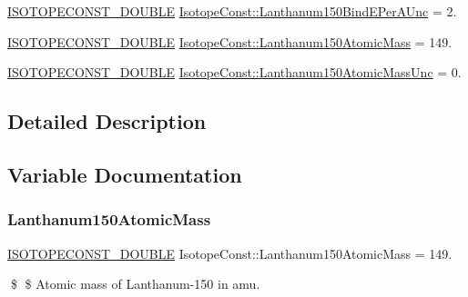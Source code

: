 \begin{DoxyCompactItemize}
\mbox{\hyperlink{group___isotope_const-_macros_ga8f45a7272ce02c0b4c65c44636ed719a}{I\+S\+O\+T\+O\+P\+E\+C\+O\+N\+S\+T\+\_\+\+D\+O\+U\+B\+LE}} \mbox{\hyperlink{group___isotope_const-_lanthanum-_la150_ga5c864ed4748572f2b13c236f3978333a}{Isotope\+Const\+::\+Lanthanum150\+Bind\+E\+Per\+A\+Unc}} = 2.
\item 
\mbox{\hyperlink{group___isotope_const-_macros_ga8f45a7272ce02c0b4c65c44636ed719a}{I\+S\+O\+T\+O\+P\+E\+C\+O\+N\+S\+T\+\_\+\+D\+O\+U\+B\+LE}} \mbox{\hyperlink{group___isotope_const-_lanthanum-_la150_ga434be1544ff86fef1501b8f6a53dda74}{Isotope\+Const\+::\+Lanthanum150\+Atomic\+Mass}} = 149.
\item 
\mbox{\hyperlink{group___isotope_const-_macros_ga8f45a7272ce02c0b4c65c44636ed719a}{I\+S\+O\+T\+O\+P\+E\+C\+O\+N\+S\+T\+\_\+\+D\+O\+U\+B\+LE}} \mbox{\hyperlink{group___isotope_const-_lanthanum-_la150_ga934d5be43c39f663f8bf9ccbf339a612}{Isotope\+Const\+::\+Lanthanum150\+Atomic\+Mass\+Unc}} = 0.
\end{DoxyCompactItemize}


\subsection{Detailed Description}


\subsection{Variable Documentation}
\mbox{\label{group___isotope_const-_lanthanum-_la150_ga434be1544ff86fef1501b8f6a53dda74}} 
\subsubsection{\texorpdfstring{Lanthanum150\+Atomic\+Mass}{Lanthanum150AtomicMass}}
{\footnotesize\ttfamily \mbox{\hyperlink{group___isotope_const-_macros_ga8f45a7272ce02c0b4c65c44636ed719a}{I\+S\+O\+T\+O\+P\+E\+C\+O\+N\+S\+T\+\_\+\+D\+O\+U\+B\+LE}} Isotope\+Const\+::\+Lanthanum150\+Atomic\+Mass = 149.}

\$ \$ Atomic mass of Lanthanum-\/150 in amu. \mbox{\label{group___isotope_const-_lanthanum-_la150_ga934d5be43c39f663f8bf9ccbf339a612}} 
